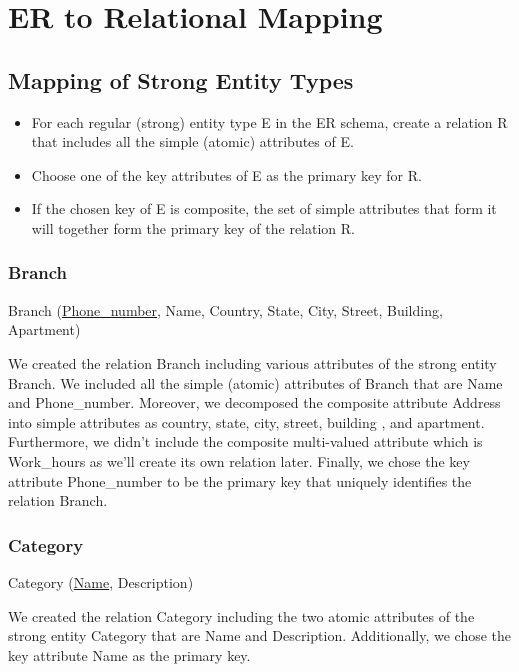 \section{ER to Relational Mapping}

\subsection{Mapping of Strong Entity Types}

\begin{itemize}
  \item For each regular (strong) entity type E in the ER schema, create a relation R that includes all the simple (atomic) attributes of E.
  \item Choose one of the key attributes of E as the primary key for R.
  \item If the chosen key of E is composite, the set of simple attributes that form it will together form the primary key of the relation R. \cite{slides}
\end{itemize}

\subsubsection{Branch}

Branch (\underline{Phone\_number}, Name, Country, State, City, Street, Building, Apartment)

We created the relation Branch including various attributes of the strong entity Branch. We included all the simple (atomic) attributes of Branch that are Name and Phone\_number. Moreover, we decomposed the composite attribute Address into simple attributes as country, state, city, street, building , and apartment. Furthermore, we didn't include the composite multi-valued attribute which is Work\_hours as we'll create its own relation later. Finally, we chose the key attribute Phone\_number to be the primary key that uniquely identifies the relation Branch.

\subsubsection{Category}

Category (\underline{Name}, Description)

We created the relation Category including the two atomic attributes of the strong entity Category that are Name and Description. Additionally, we chose the key attribute Name as the primary key.

